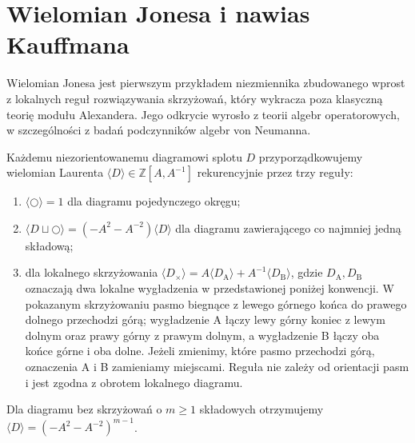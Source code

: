 \section{Wielomian Jonesa i nawias Kauffmana}
\label{sec:kt-jones}

Wielomian Jonesa jest pierwszym przykładem niezmiennika zbudowanego
wprost z lokalnych reguł rozwiązywania skrzyżowań, który wykracza
poza klasyczną teorię modułu Alexandera. Jego odkrycie wyrosło
z teorii algebr operatorowych, w szczególności z badań podczynników
algebr von Neumanna.

\begin{definicja}
Każdemu niezorientowanemu diagramowi splotu $D$ przyporządkowujemy
wielomian Laurenta $\langle D\rangle\in\mathbb Z[A,A^{-1}]$
rekurencyjnie przez trzy reguły:
\begin{enumerate}[label=(\roman*)]
\item $\langle\bigcirc\rangle=1$ dla diagramu pojedynczego okręgu;
\item $\langle D\sqcup\bigcirc\rangle=
(-A^2-A^{-2})\langle D\rangle$ dla diagramu zawierającego
co najmniej jedną składową;
\item dla lokalnego skrzyżowania
$\langle D_{\times}\rangle
=A\langle D_{\mathrm A}\rangle+A^{-1}\langle D_{\mathrm B}\rangle$,
gdzie $D_{\mathrm A},D_{\mathrm B}$ oznaczają dwa lokalne
wygładzenia w przedstawionej poniżej konwencji. W pokazanym
skrzyżowaniu pasmo biegnące z lewego górnego końca do prawego
dolnego przechodzi górą; wygładzenie A łączy lewy górny
koniec z lewym dolnym oraz prawy górny z prawym dolnym,
a wygładzenie B łączy oba końce górne i oba dolne.
Jeżeli zmienimy, które pasmo przechodzi górą, oznaczenia
A i B zamieniamy miejscami. Reguła nie zależy od orientacji
pasm i jest zgodna z obrotem lokalnego diagramu.
\end{enumerate}
Dla diagramu bez skrzyżowań o $m\geq1$ składowych otrzymujemy
$\langle D\rangle=(-A^2-A^{-2})^{m-1}$.
\end{definicja}

